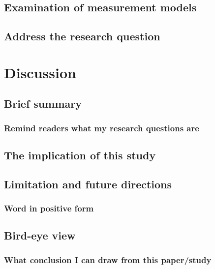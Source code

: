 \documentclass[a4paper,11pt,UKenglish,twoside,openright]{report}\usepackage[]{graphicx}\usepackage[]{color}
\begin{document}
\section{Examination of measurement models}





\section{Address the research question}




\chapter{Discussion}
\label{chp:5}

\section{Brief summary}

\subsection{Remind readers what my research questions are}

\section{The implication of this study}

\section{Limitation and future directions}

\subsection{Word in positive form}

\section{Bird-eye view}

\subsection{What conclusion I can draw from this paper/study}
\end{document}
